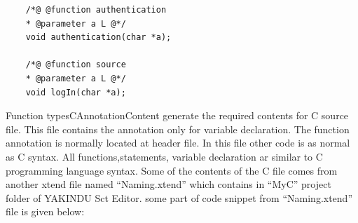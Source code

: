 \begin{lstlisting}
	/*@ @function authentication
	* @parameter a L @*/
	void authentication(char *a);
	
	/*@ @function source
	* @parameter a L @*/
	void logIn(char *a);
\end{lstlisting}

Function typesCAnnotationContent generate the required contents for C source file. This file contains the annotation only for variable declaration. The function annotation is normally located at header file. In this file other code is as normal as C syntax. All functions,statements, variable declaration ar similar to C programming language syntax. Some of the contents of the C file comes from another xtend file named \enquote{Naming.xtend} which contains in \enquote{MyC} project folder of YAKINDU Sct Editor. some part of code snippet from \enquote{Naming.xtend} file is given below:

